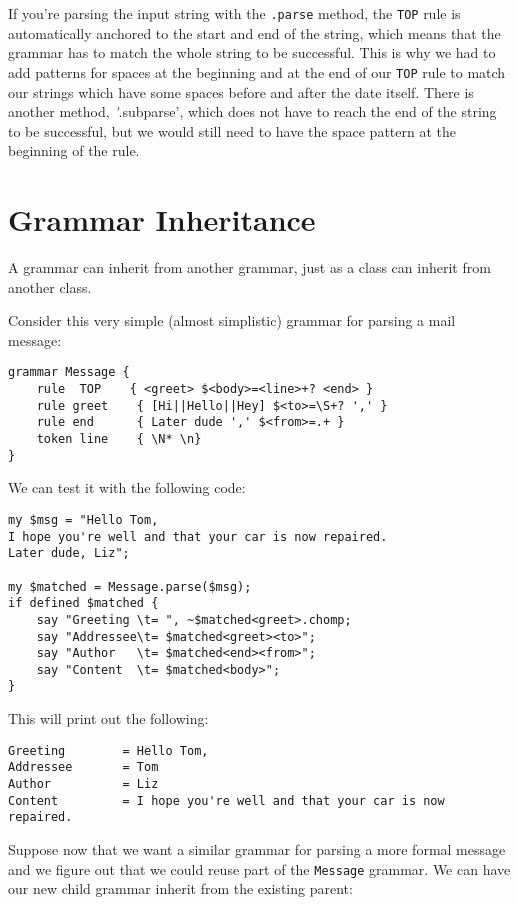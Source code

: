 If you're parsing the input string with the {\tt .parse} method,
the {\tt TOP} rule is automatically anchored to the start and end 
of the string, which means that the grammar has to match 
the whole string to be successful. This is why we had to 
add patterns for spaces at the beginning and at the end of 
our {\tt TOP} rule to match our strings which have some 
spaces before and after the date itself. There is another 
method, \emph'.subparse', which does not have to reach the 
end of the string to be successful, but we would still need to 
have the space pattern at the beginning of the rule.

\section{Grammar Inheritance}

A grammar can inherit from another grammar, just as a 
class can inherit from another class.

Consider this very simple (almost simplistic) grammar 
for parsing a mail message:

\begin{verbatim}
grammar Message {
    rule  TOP    { <greet> $<body>=<line>+? <end> }
    rule greet    { [Hi||Hello||Hey] $<to>=\S+? ',' }
    rule end      { Later dude ',' $<from>=.+ }
    token line    { \N* \n}
}
\end{verbatim}

We can test it with the following code:

\begin{verbatim}
my $msg = "Hello Tom,
I hope you're well and that your car is now repaired.
Later dude, Liz";

my $matched = Message.parse($msg);
if defined $matched { 
    say "Greeting \t= ", ~$matched<greet>.chomp;
    say "Addressee\t= $matched<greet><to>";
    say "Author   \t= $matched<end><from>";
    say "Content  \t= $matched<body>";
}
\end{verbatim}

This will print out the following:

\begin{verbatim}
Greeting        = Hello Tom,
Addressee       = Tom
Author          = Liz
Content         = I hope you're well and that your car is now repaired.
\end{verbatim}

Suppose now that we want a similar grammar for parsing 
a more formal message and we figure out that we could 
reuse part of the {\tt Message} grammar. We can have our 
new child grammar inherit from the existing parent:

